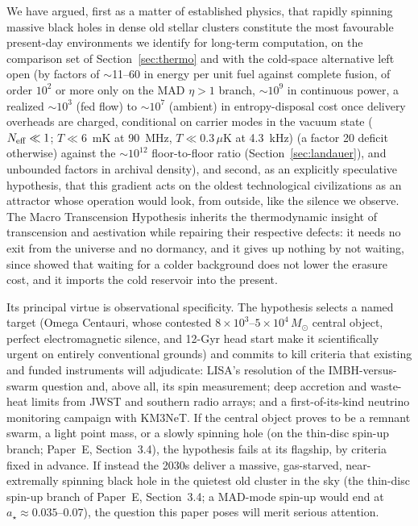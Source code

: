 \documentclass[11pt]{article}
\newcommand{\msun}{\ensuremath{M_\odot}}
\newcommand{\astar}{\ensuremath{a_\star}}
\begin{document}
We have argued, first as a matter of established physics, that rapidly spinning massive black holes in dense old stellar clusters constitute the most favourable present-day environments we identify for long-term computation, on the comparison set of Section~\ref{sec:thermo} and with the cold-space alternative left open (by factors of $\sim$11--60 in energy per unit fuel against complete fusion, of order $10^{2}$ or more only on the MAD $\eta > 1$ branch, $\sim$$10^{9}$ in continuous power, a realized $\sim 10^{3}$ (fed flow) to $\sim 10^{7}$ (ambient) in entropy-disposal cost once delivery overheads are charged, conditional on carrier modes in the vacuum state ($N_{\rm eff}\ll1$; $T\ll6$~mK at 90~MHz, $T\ll0.3\,\mu$K at 4.3~kHz) (a factor 20 deficit otherwise) against the $\sim$$10^{12}$ floor-to-floor ratio (Section~\ref{sec:landauer}), and unbounded factors in archival density), and second, as an explicitly speculative hypothesis, that this gradient acts on the oldest technological civilizations as an attractor whose operation would look, from outside, like the silence we observe. The Macro Transcension Hypothesis inherits the thermodynamic insight of transcension and aestivation while repairing their respective defects: it needs no exit from the universe and no dormancy, and it gives up nothing by not waiting, since \citet{Bennett2019} showed that waiting for a colder background does not lower the erasure cost, and it imports the cold reservoir into the present.

Its principal virtue is observational specificity. The hypothesis selects a named target (Omega Centauri, whose contested $8\times10^{3}$--$5\times10^{4}\,\msun$ central object, perfect electromagnetic silence, and 12-Gyr head start make it scientifically urgent on entirely conventional grounds) and commits to kill criteria that existing and funded instruments will adjudicate: LISA's resolution of the IMBH-versus-swarm question and, above all, its spin measurement; deep accretion and waste-heat limits from JWST and southern radio arrays; and a first-of-its-kind neutrino monitoring campaign with KM3NeT. If the central object proves to be a remnant swarm, a light point mass, or a slowly spinning hole (on the thin-disc spin-up branch; Paper~E, Section~3.4), the hypothesis fails at its flagship, by criteria fixed in advance. If instead the 2030s deliver a massive, gas-starved, near-extremally spinning black hole in the quietest old cluster in the sky (the thin-disc spin-up branch of Paper~E, Section~3.4; a MAD-mode spin-up would end at $\astar \approx 0.035$--$0.07$), the question this paper poses will merit serious attention.
\end{document}
